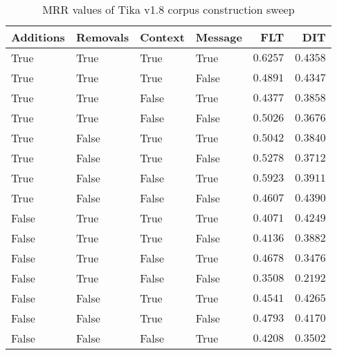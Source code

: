
\begin{table}
\begin{spacing}{1.2}
\centering
\caption{MRR values of Tika v1.8 corpus construction sweep}
\label{table:tika_corpus_sweep}
\vspace{0.2em}
\begin{tabular}{llll|rr}
\toprule
Additions & Removals & Context & Message & FLT &        DIT \\
\midrule
     True &     True &    True &    True &    $\bm{0.6257}$ &      $0.4358$ \\
     True &     True &    True &   False &         $0.4891$ &      $0.4347$ \\
     True &     True &   False &    True &         $0.4377$ &      $0.3858$ \\
     True &     True &   False &   False &         $0.5026$ &      $0.3676$ \\
     True &    False &    True &    True &         $0.5042$ &      $0.3840$ \\
     True &    False &    True &   False &         $0.5278$ &      $0.3712$ \\
     True &    False &   False &    True &         $0.5923$ &      $0.3911$ \\
     True &    False &   False &   False &         $0.4607$ & $\bm{0.4390}$ \\
    False &     True &    True &    True &         $0.4071$ &      $0.4249$ \\
    False &     True &    True &   False &         $0.4136$ &      $0.3882$ \\
    False &     True &   False &    True &         $0.4678$ &      $0.3476$ \\
    False &     True &   False &   False &         $0.3508$ &      $0.2192$ \\
    False &    False &    True &    True &         $0.4541$ &      $0.4265$ \\
    False &    False &    True &   False &         $0.4793$ &      $0.4170$ \\
    False &    False &   False &    True &         $0.4208$ &      $0.3502$ \\
\bottomrule
\end{tabular}

\end{spacing}
\end{table}
